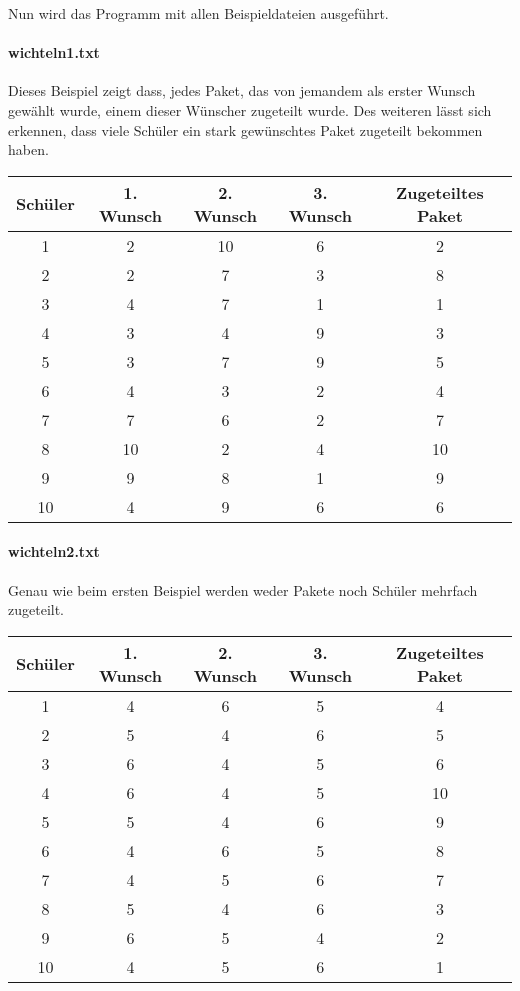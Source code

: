 \documentclass[a4paper,10pt,ngerman]{scrartcl}
\begin{document}
Nun wird das Programm mit allen Beispieldateien ausgeführt.

\paragraph{wichteln1.txt}
Dieses Beispiel zeigt dass, jedes Paket, das von jemandem als erster Wunsch gewählt wurde, einem dieser Wünscher zugeteilt wurde.
Des weiteren lässt sich erkennen, dass viele Schüler ein stark gewünschtes Paket zugeteilt bekommen haben.
\begin{longtable}[c]{c|c|c|c|c}
    Schüler & 1. Wunsch & 2. Wunsch & 3. Wunsch & Zugeteiltes Paket \\
    \hline
    \endhead
    1 & 2 & 10 & 6 & 2 \\
    2 & 2 & 7 & 3 & 8 \\
    3 & 4 & 7 & 1 & 1 \\
    4 & 3 & 4 & 9 & 3 \\
    5 & 3 & 7 & 9 & 5 \\
    6 & 4 & 3 & 2 & 4 \\
    7 & 7 & 6 & 2 & 7 \\
    8 & 10 & 2 & 4 & 10 \\
    9 & 9 & 8 & 1 & 9 \\
    10 & 4 & 9 & 6 & 6
\end{longtable}

\paragraph{wichteln2.txt}
Genau wie beim ersten Beispiel werden weder Pakete noch Schüler mehrfach zugeteilt.
\begin{longtable}[c]{c|c|c|c|c}
    Schüler & 1. Wunsch & 2. Wunsch & 3. Wunsch & Zugeteiltes Paket \\
    \hline
    \endhead
    1 & 4 & 6 & 5 & 4 \\
    2 & 5 & 4 & 6 & 5 \\
    3 & 6 & 4 & 5 & 6 \\
    4 & 6 & 4 & 5 & 10 \\
    5 & 5 & 4 & 6 & 9 \\
    6 & 4 & 6 & 5 & 8 \\
    7 & 4 & 5 & 6 & 7 \\
    8 & 5 & 4 & 6 & 3 \\
    9 & 6 & 5 & 4 & 2 \\
    10 & 4 & 5 & 6 & 1
\end{longtable}
\end{document}
